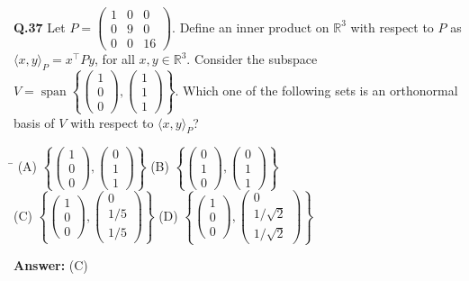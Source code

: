 \documentclass[11pt,a4paper]{article}
\newcommand{\optsfourA}[4]{%
  \begin{tabbing}
    \hspace{0.48\linewidth}\=\kill
    (A) #1 \> (B) #2 \\[2pt]
    (C) #3 \> (D) #4
  \end{tabbing}%
}
\newcommand{\ans}[1]{\textbf{Answer:} #1\par\medskip}
\begin{document}
\textbf{Q.37} Let $P = \begin{pmatrix} 1 & 0 & 0 \\ 0 & 9 & 0 \\ 0 & 0 & 16 \end{pmatrix}$. Define an inner product on $\mathbb{R}^3$ with respect to $P$ as $\langle x, y \rangle_P = x^\top P y$, for all $x, y \in \mathbb{R}^3$. Consider the subspace $V = \operatorname{span}\left\{\begin{pmatrix} 1 \\ 0 \\ 0 \end{pmatrix}, \begin{pmatrix} 1 \\ 1 \\ 1 \end{pmatrix}\right\}$. Which one of the following sets is an orthonormal basis of $V$ with respect to $\langle x, y \rangle_P$?
\optsfourA{$\left\{\begin{pmatrix} 1 \\ 0 \\ 0 \end{pmatrix}, \begin{pmatrix} 0 \\ 1 \\ 1 \end{pmatrix}\right\}$}{$\left\{\begin{pmatrix} 0 \\ 1 \\ 0 \end{pmatrix}, \begin{pmatrix} 0 \\ 1 \\ 1 \end{pmatrix}\right\}$}{$\left\{\begin{pmatrix} 1 \\ 0 \\ 0 \end{pmatrix}, \begin{pmatrix} 0 \\ 1/5 \\ 1/5 \end{pmatrix}\right\}$}{$\left\{\begin{pmatrix} 1 \\ 0 \\ 0 \end{pmatrix}, \begin{pmatrix} 0 \\ 1/\sqrt{2} \\ 1/\sqrt{2} \end{pmatrix}\right\}$}
\ans{(C)}
\end{document}
